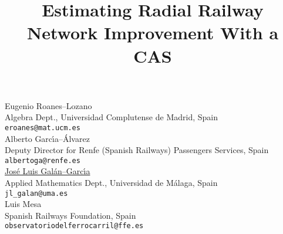 \documentclass[article,A4,11pt]{llncs}%
\begin{document}
\title{Estimating Radial Railway Network Improvement With a CAS}
 \author{} \institute{}
\maketitle
\begin{center}
{\large Eugenio Roanes--Lozano}\\
Algebra Dept., Universidad Complutense de Madrid, Spain\\
{\tt eroanes@mat.ucm.es}
\\ \vspace{4mm}
{\large Alberto Garc\'{\i}a--\'Alvarez}\\
Deputy Director for Renfe (Spanish Railways) Passengers Services, Spain\\
{\tt albertoga@renfe.es}
\\ \vspace{4mm}
{\large \underline{Jos\'e Luis Gal\'an--Garc\'{\i}a}}\\
Applied Mathematics Dept., Universidad de M\'alaga, Spain\\
{\tt jl\_galan@uma.es}
\\ \vspace{4mm}
{\large Luis Mesa}\\
Spanish Railways Foundation, Spain\\
{\tt observatoriodelferrocarril@ffe.es}
\end{center}
\end{document}
